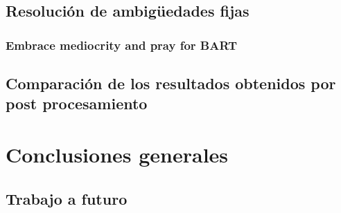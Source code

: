 \documentclass[a4paper,12pt,oneside,onecolumn,final,openright]{book}%
\begin{document}
\section{Resolución de ambigüedades fijas}
\subsection{Embrace mediocrity and pray for BART}
\section{Comparación de los resultados obtenidos por post procesamiento}
\chapter*{Conclusiones generales}
\section*{Trabajo a futuro}
\end{document}
